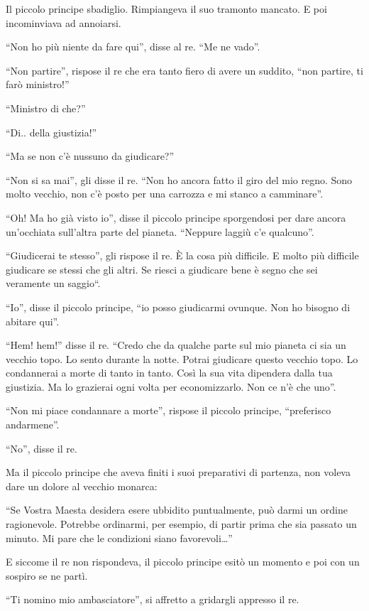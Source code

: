 \documentclass[11pt]{scrbook}
\begin{document}
Il piccolo principe sbadiglio. Rimpiangeva il suo tramonto mancato. E
poi incominviava ad annoiarsi.

``Non ho più niente da fare qui'', disse al re. ``Me ne vado''.

``Non partire'', rispose il re che era tanto fiero di avere un suddito,
``non partire, ti farò ministro!''

``Ministro di che?''

``Di.. della giustizia!''

``Ma se non c'è nussuno da giudicare?''

``Non si sa mai'', gli disse il re. ``Non ho ancora fatto il giro del
mio regno. Sono molto vecchio, non c'è posto per una carrozza e mi stanco
a camminare''.

``Oh! Ma ho già visto io'', disse il piccolo principe sporgendosi per
dare ancora un'occhiata sull'altra parte del pianeta. ``Neppure laggiù
c'e qualcuno''.

``Giudicerai te stesso'', gli rispose il re. È la cosa più difficile. E
molto più difficile giudicare se stessi che gli altri. Se riesci a
giudicare bene è segno che sei veramente un saggio``.

``Io'', disse il piccolo principe, ``io posso giudicarmi ovunque. Non ho
bisogno di abitare qui''.

``Hem! hem!'' disse il re. ``Credo che da qualche parte sul mio pianeta
ci sia un vecchio topo. Lo sento durante la notte. Potrai giudicare
questo vecchio topo. Lo condannerai a morte di tanto in tanto. Così la
sua vita dipendera dalla tua giustizia. Ma lo grazierai ogni volta per
economizzarlo. Non ce n'è che uno''.

``Non mi piace condannare a morte'', rispose il piccolo principe,
``preferisco andarmene''.

``No'', disse il re.

Ma il piccolo principe che aveva finiti i suoi preparativi di partenza,
non voleva dare un dolore al vecchio monarca:

``Se Vostra Maesta desidera esere ubbidito puntualmente, può darmi un
ordine ragionevole. Potrebbe ordinarmi, per esempio, di partir prima che
sia passato un minuto. Mi pare che le condizioni siano
favorevoli\ldots{}''

E siccome il re non rispondeva, il piccolo principe esitò un momento e
poi con un sospiro se ne partì.

``Ti nomino mio ambasciatore'', si affretto a gridargli appresso il re.
\end{document}
